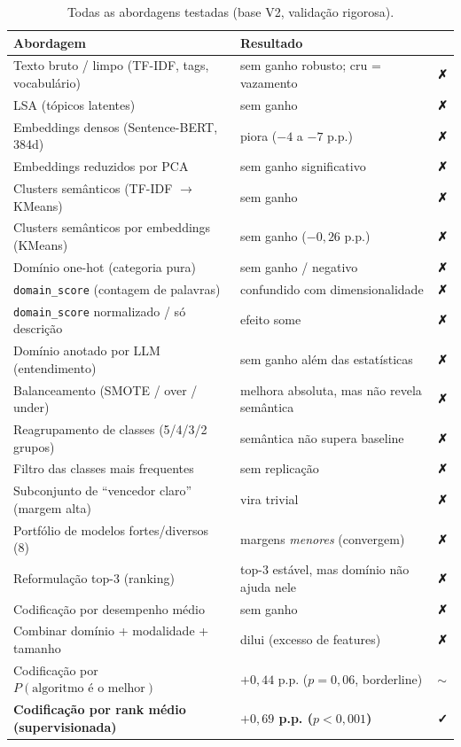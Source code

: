 \documentclass[11pt]{article}
\newcommand{\ok}{\textcolor{ok}{\textbf{✓}}}
\newcommand{\no}{\textcolor{no}{\textbf{✗}}}
\begin{document}
\begin{table}[H]\centering
\caption{Todas as abordagens testadas (base V2, validação rigorosa).}
\label{tab:tentativas}
\small
\begin{tabular}{lll}
\toprule
Abordagem & Resultado & \\
\midrule
Texto bruto / limpo (TF-IDF, tags, vocabulário) & sem ganho robusto; cru = vazamento & \no \\
LSA (tópicos latentes) & sem ganho & \no \\
Embeddings densos (Sentence-BERT, 384d) & piora ($-4$ a $-7$ p.p.) & \no \\
Embeddings reduzidos por PCA & sem ganho significativo & \no \\
Clusters semânticos (TF-IDF $\rightarrow$ KMeans) & sem ganho & \no \\
Clusters semânticos por embeddings (KMeans) & sem ganho ($-0{,}26$ p.p.) & \no \\
Domínio one-hot (categoria pura) & sem ganho / negativo & \no \\
\texttt{domain\_score} (contagem de palavras) & confundido com dimensionalidade & \no \\
\texttt{domain\_score} normalizado / só descrição & efeito some & \no \\
Domínio anotado por LLM (entendimento) & sem ganho além das estatísticas & \no \\
Balanceamento (SMOTE / over / under) & melhora absoluta, mas não revela semântica & \no \\
Reagrupamento de classes (5/4/3/2 grupos) & semântica não supera baseline & \no \\
Filtro das classes mais frequentes & sem replicação & \no \\
Subconjunto de ``vencedor claro'' (margem alta) & vira trivial & \no \\
Portfólio de modelos fortes/diversos (8) & margens \emph{menores} (convergem) & \no \\
Reformulação top-3 (ranking) & top-3 estável, mas domínio não ajuda nele & \no \\
Codificação por desempenho médio & sem ganho & \no \\
Combinar domínio + modalidade + tamanho & dilui (excesso de features) & \no \\
\midrule
Codificação por $P(\text{algoritmo é o melhor})$ & $+0{,}44$ p.p. ($p=0{,}06$, borderline) & $\sim$ \\
\textbf{Codificação por rank médio (supervisionada)} & \textbf{$+0{,}69$ p.p. ($p<0{,}001$)} & \ok \\
\bottomrule
\end{tabular}
\end{table}
\end{document}
